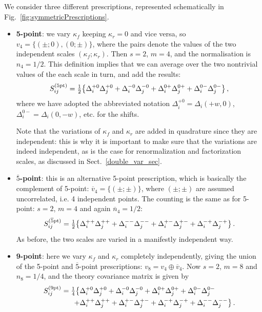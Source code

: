 We consider three different prescriptions, represented schematically
in Fig.~\ref{fig:symmetricPrescriptions}.
\begin{itemize}
%
\item \textbf{5-point}: we vary $\kappa_f$ keeping $\kappa_r = 0$ and vice versa, so 
$v_4 = \{(\pm;0), (0; \pm) \}$, where the pairs denote the values of
  the two independent scales $(\kappa_f; \kappa_r)$. Then $s=2$,
  $m=4$, and the normalisation is $n_4 = 1/2$.
%
  This definition implies that we can average over the two nontrivial values
  of the each scale in turn, and add the results: 
\begin{equation}\label{5S}
    S^{\rm (5pt)}_{ij} = \hbox{${{1}\over {2}}$}\big\{ \Delta_i^{+0}\Delta_j^{+0} + \Delta_i^{-0} \Delta_j^{-0} + \Delta_i^{0+} \Delta_j^{0+} + \Delta_i^{0-} \Delta_j^{0-}  \big\} \, ,
\end{equation}
where 
we have adopted the abbreviated notation $\Delta_i^{+0}=\Delta_i(+w,0)$, $\Delta_i^{0-}=\Delta_i(0,-w)$, etc. for the shifts. 

Note that the variations of $\kappa_f$ and $\kappa_r$ are added in quadrature since they are
  independent: this is why it is important to make sure that the
  variations are indeed independent, as is the case for
  renormalization and factorization scales, as discussed in Sect.~\ref{double_var_sec}. 

\item \textbf{$\overline{5}$-point}: this is an alternative 5-point
  prescription, which is basically the complement of 5-point:
  $\overline{v}_4 = \{(\pm; \pm) \}$, where $(\pm;\pm)$ are assumed
  uncorrelated, i.e. 4 independent points.
  The counting is the same
  as for 5-point: $s=2$, $m=4$ and again $\overline{n}_4 = 1/2$:  
\begin{equation}\label{5bS}
    S^{(\rm \overline{5}pt)}_{ij} = \hbox{${{1}\over {2}}$}\big\{ \Delta_i^{++}\Delta_j^{++} + \Delta_i^{--}\Delta_j^{--} + \Delta_i^{+-}\Delta_j^{+-} + \Delta_i^{-+} \Delta_j^{-+}\big\} \, .
\end{equation}
As before, the two scales are varied in a manifestly independent way.

\item \textbf{9-point}: here we vary $\kappa_f$ and $\kappa_r$
  completely independently, giving the union of the 5-point and
  $\overline{5}$-point prescriptions: $v_8=v_4\oplus \overline{v}_4$.  Now $s=2$, $m=8$ and $n_8=1/4$, and
  the theory covariance matrix is given by
\begin{equation}\label{9S}
\begin{split}
    S^{(\rm 9pt)}_{ij} = \hbox{${{1}\over {4}}$}\big\{ &\Delta_i^{+0} \Delta_j^{+0} + \Delta_i^{-0}\Delta_j^{-0}
                            + \Delta_i^{0+} \Delta_j^{0+} + \Delta_i^{0-}\Delta_j^{0-} \\
                            + &\Delta_i^{++}\Delta_j^{++} + \Delta_i^{+-} \Delta_j^{+-}
                            + \Delta_i^{-+}\Delta_j^{-+} + \Delta_i^{--} \Delta_j^{--} \big\} \, .
\end{split}                            
\end{equation}
\end{itemize}

